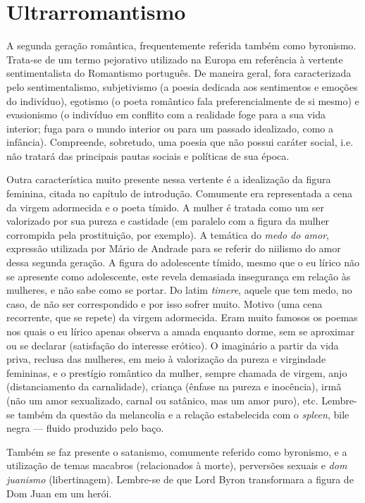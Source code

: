 \documentclass[12pt]{book}
\begin{document}
			\section{Ultrarromantismo}
			\par A segunda geração romântica, frequentemente referida também como byronismo. Trata-se de um termo pejorativo utilizado na Europa em referência à vertente sentimentalista do Romantismo português. De maneira geral, fora caracterizada pelo sentimentalismo, subjetivismo (a poesia dedicada aos sentimentos e emoções do indivíduo), egotismo (o poeta romântico fala preferencialmente de si mesmo) e  evasionismo (o indivíduo em conflito com a realidade foge para a sua vida interior; fuga para o mundo interior ou para um passado idealizado, como a infância). Compreende, sobretudo, uma poesia que não possui caráter social, i.e. não tratará das principais pautas sociais e políticas de sua época.
			\par Outra característica muito presente nessa vertente é a idealização da figura feminina, citada no capítulo de introdução. Comumente era representada a cena da virgem adormecida e o poeta tímido. A mulher é tratada como um ser valorizado por sua pureza e castidade (em paralelo com a figura da mulher corrompida pela prostituição, por exemplo). A temática do \textit{medo do amor}, expressão utilizada por Mário de Andrade para se referir do niilismo do amor dessa segunda geração. A figura do adolescente tímido, mesmo que o eu lírico não se apresente como adolescente, este revela demasiada insegurança em relação às mulheres, e não sabe como se portar. Do latim \textit{timere}, aquele que tem medo, no caso, de não ser correspondido e por isso sofrer muito. Motivo (uma cena recorrente, que se repete) da virgem adormecida. Eram muito famosos os poemas nos quais o eu lírico apenas observa a amada enquanto dorme, sem se aproximar ou se declarar (satisfação do interesse erótico). O imaginário a partir da vida priva, reclusa das mulheres, em meio à valorização da pureza e virgindade femininas, e o prestígio romântico da mulher, sempre chamada de virgem, anjo (distanciamento da carnalidade), criança (ênfase na pureza e inocência), irmã (não um amor sexualizado, carnal ou satânico, mas um amor puro), etc. Lembre-se também da questão da melancolia e a relação estabelecida com o \textit{spleen}, bile negra — fluido produzido pelo baço.
			\par Também se faz presente o satanismo, comumente referido como byronismo, e a utilização de temas macabros (relacionados à morte), perversões sexuais e \textit{dom juanismo} (libertinagem). Lembre-se de que Lord Byron transformara a figura de Dom Juan em um herói. 
\end{document}
